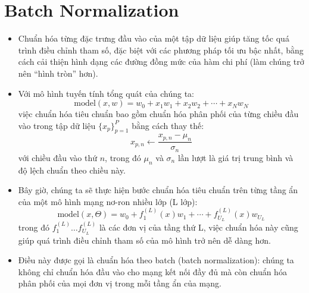 \documentclass{book}
\begin{document}
\section{Batch Normalization}
\begin{itemize}
    \item Chuẩn hóa từng đặc trưng đầu vào của một tập dữ liệu giúp tăng tốc quá trình điều chỉnh tham số, đặc biệt với các phương pháp tối ưu bậc nhất, bằng cách cải thiện hình dạng các đường đồng mức của hàm chi phí (làm chúng trở nên “hình tròn” hơn).
    \item Với mô hình tuyến tính tổng quát của chúng ta:
    \[
    \text{model}(x, w) = w_0 + x_1 w_1 + x_2 w_2 + \cdots + x_N w_N
    \]
    việc chuẩn hóa tiêu chuẩn bao gồm chuẩn hóa phân phối của từng chiều đầu vào trong tập dữ liệu $\{x_p\}^{P}_{p=1}$ bằng cách thay thế:
    \[
    x_{p,n} \leftarrow \frac{x_{p,n} - \mu_n}{\sigma_n}
    \]
    với chiều đầu vào thứ $n$, trong đó $\mu_n$ và $\sigma_n$ lần lượt là giá trị trung bình và độ lệch chuẩn theo chiều này.
    \item Bây giờ, chúng ta sẽ thực hiện bước chuẩn hóa tiêu chuẩn trên từng tầng ẩn của một mô hình mạng nơ-ron nhiều lớp (L lớp):
    \[
    \text{model}(x, \Theta) = w_0 + f^{(L)}_1(x) w_1 + \cdots + f^{(L)}_{U_L}(x) w_{U_L}
    \]
    trong đó $f^{(L)}_1 \dots f^{(L)}_{U_L}$ là các đơn vị của tầng thứ L, việc chuẩn hóa này cũng giúp quá trình điều chỉnh tham số của mô hình trở nên dễ dàng hơn.
    \item Điều này được gọi là chuẩn hóa theo batch (batch normalization): chúng ta không chỉ chuẩn hóa đầu vào cho mạng kết nối đầy đủ mà còn chuẩn hóa phân phối của mọi đơn vị trong mỗi tầng ẩn của mạng.
\end{itemize}
\end{document}
